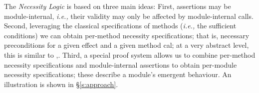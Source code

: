  
The \textit{Necessity Logic} is based on three main ideas: 
First, assertions may be module-internal, \textit{i.e.,}
their validity may only be affected by module-internal calls. 
Second, leveraging the classical  specifications of methods 
(\textit{i.e.,} the sufficient conditions) we can obtain per-method
 necessity specifications; that is, necessary preconditions
  for a given effect and a given method cal;  at a very abstract level, this is
similar to  \cite{threoremsFreeSep},.
Third,  a special proof system allows us to combine 
per-method
 necessity specifications and module-internal assertions 
 to obtain per-module  necessity specifications; these describe a module's
 emergent behaviour.
An illustration is shown in  \S\ref{s:approach}.
 
% 
% 
%
% 
% 

